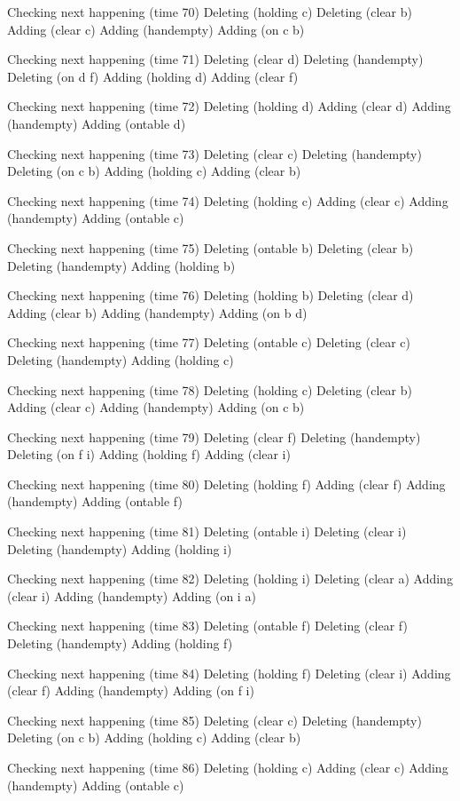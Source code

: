 Checking next happening (time 70)
Deleting (holding c)
Deleting (clear b)
Adding (clear c)
Adding (handempty)
Adding (on c b)

Checking next happening (time 71)
Deleting (clear d)
Deleting (handempty)
Deleting (on d f)
Adding (holding d)
Adding (clear f)

Checking next happening (time 72)
Deleting (holding d)
Adding (clear d)
Adding (handempty)
Adding (ontable d)

Checking next happening (time 73)
Deleting (clear c)
Deleting (handempty)
Deleting (on c b)
Adding (holding c)
Adding (clear b)

Checking next happening (time 74)
Deleting (holding c)
Adding (clear c)
Adding (handempty)
Adding (ontable c)

Checking next happening (time 75)
Deleting (ontable b)
Deleting (clear b)
Deleting (handempty)
Adding (holding b)

Checking next happening (time 76)
Deleting (holding b)
Deleting (clear d)
Adding (clear b)
Adding (handempty)
Adding (on b d)

Checking next happening (time 77)
Deleting (ontable c)
Deleting (clear c)
Deleting (handempty)
Adding (holding c)

Checking next happening (time 78)
Deleting (holding c)
Deleting (clear b)
Adding (clear c)
Adding (handempty)
Adding (on c b)

Checking next happening (time 79)
Deleting (clear f)
Deleting (handempty)
Deleting (on f i)
Adding (holding f)
Adding (clear i)

Checking next happening (time 80)
Deleting (holding f)
Adding (clear f)
Adding (handempty)
Adding (ontable f)

Checking next happening (time 81)
Deleting (ontable i)
Deleting (clear i)
Deleting (handempty)
Adding (holding i)

Checking next happening (time 82)
Deleting (holding i)
Deleting (clear a)
Adding (clear i)
Adding (handempty)
Adding (on i a)

Checking next happening (time 83)
Deleting (ontable f)
Deleting (clear f)
Deleting (handempty)
Adding (holding f)

Checking next happening (time 84)
Deleting (holding f)
Deleting (clear i)
Adding (clear f)
Adding (handempty)
Adding (on f i)

Checking next happening (time 85)
Deleting (clear c)
Deleting (handempty)
Deleting (on c b)
Adding (holding c)
Adding (clear b)

Checking next happening (time 86)
Deleting (holding c)
Adding (clear c)
Adding (handempty)
Adding (ontable c)

